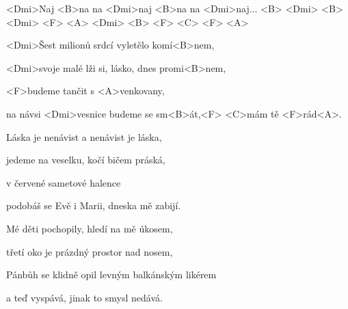 
\zr

<Dmi>Naj <B>na na <Dmi>naj <B>na na <Dmi>naj... 
 <B> <Dmi> <B> <Dmi> <F> <A> <Dmi> 
 <B> <F> <C> <F> <A> 

\kr
\zs

<Dmi>Šest milionů srdcí vyletělo komí<B>nem,

<Dmi>svoje malé lži si, lásko, dnes promi<B>nem,

<F>budeme tančit s <A>venkovany,

na návsi <Dmi>vesnice budeme se sm<B>át,<F> <C>mám tě <F>rád<A>.

\ks

\zr \kr

\zs

Láska je nenávist a nenávist je láska,

jedeme na veselku, kočí bičem práská,

v červené sametové halence

podobáš se Evě i Marii, dneska mě zabijí.

\ks

\zr \kr

\zs

Mé děti pochopily, hledí na mě úkosem,

třetí oko je prázdný prostor nad nosem,

Pánbůh se klidně opil levným balkánským likérem

a teď vyspává, jinak to smysl nedává.

\ks

\zr
\kr

\kp




